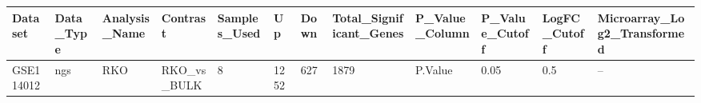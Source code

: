 \begingroup
\tiny
\setlength{\tabcolsep}{2pt}
\renewcommand{\arraystretch}{1.18}
\begin{tabular}{@{}llllllllllll@{}}
\toprule
Dataset & Data\_Type & Analysis\_Name & Contrast & Samples\_Used & Up & Down & Total\_Significant\_Genes & P\_Value\_Column & P\_Value\_Cutoff & LogFC\_Cutoff & Microarray\_Log2\_Transformed \\
\midrule
GSE114012 & ngs & RKO & RKO\_vs\_BULK & 8 & 1252 & 627 & 1879 & P.Value & 0.05 & 0.5 & -- \\
\bottomrule
\end{tabular}
\endgroup
